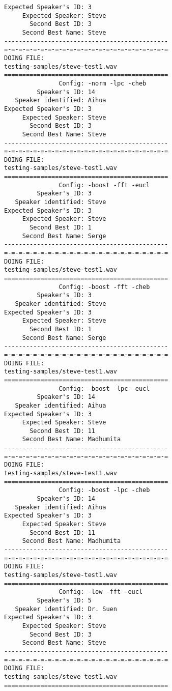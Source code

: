 \begin{verbatim}
Expected Speaker's ID: 3
     Expected Speaker: Steve
       Second Best ID: 3
     Second Best Name: Steve
---------------------------------------------
=-=-=-=-=-=-=-=-=-=-=-=-=-=-=-=-=-=-=-=-=-=-=
DOING FILE:
testing-samples/steve-test1.wav
=============================================
               Config: -norm -lpc -cheb
         Speaker's ID: 14
   Speaker identified: Aihua
Expected Speaker's ID: 3
     Expected Speaker: Steve
       Second Best ID: 3
     Second Best Name: Steve
---------------------------------------------
=-=-=-=-=-=-=-=-=-=-=-=-=-=-=-=-=-=-=-=-=-=-=
DOING FILE:
testing-samples/steve-test1.wav
=============================================
               Config: -boost -fft -eucl
         Speaker's ID: 3
   Speaker identified: Steve
Expected Speaker's ID: 3
     Expected Speaker: Steve
       Second Best ID: 1
     Second Best Name: Serge
---------------------------------------------
=-=-=-=-=-=-=-=-=-=-=-=-=-=-=-=-=-=-=-=-=-=-=
DOING FILE:
testing-samples/steve-test1.wav
=============================================
               Config: -boost -fft -cheb
         Speaker's ID: 3
   Speaker identified: Steve
Expected Speaker's ID: 3
     Expected Speaker: Steve
       Second Best ID: 1
     Second Best Name: Serge
---------------------------------------------
=-=-=-=-=-=-=-=-=-=-=-=-=-=-=-=-=-=-=-=-=-=-=
DOING FILE:
testing-samples/steve-test1.wav
=============================================
               Config: -boost -lpc -eucl
         Speaker's ID: 14
   Speaker identified: Aihua
Expected Speaker's ID: 3
     Expected Speaker: Steve
       Second Best ID: 11
     Second Best Name: Madhumita
---------------------------------------------
=-=-=-=-=-=-=-=-=-=-=-=-=-=-=-=-=-=-=-=-=-=-=
DOING FILE:
testing-samples/steve-test1.wav
=============================================
               Config: -boost -lpc -cheb
         Speaker's ID: 14
   Speaker identified: Aihua
Expected Speaker's ID: 3
     Expected Speaker: Steve
       Second Best ID: 11
     Second Best Name: Madhumita
---------------------------------------------
=-=-=-=-=-=-=-=-=-=-=-=-=-=-=-=-=-=-=-=-=-=-=
DOING FILE:
testing-samples/steve-test1.wav
=============================================
               Config: -low -fft -eucl
         Speaker's ID: 5
   Speaker identified: Dr. Suen
Expected Speaker's ID: 3
     Expected Speaker: Steve
       Second Best ID: 3
     Second Best Name: Steve
---------------------------------------------
=-=-=-=-=-=-=-=-=-=-=-=-=-=-=-=-=-=-=-=-=-=-=
DOING FILE:
testing-samples/steve-test1.wav
=============================================

\end{verbatim}

